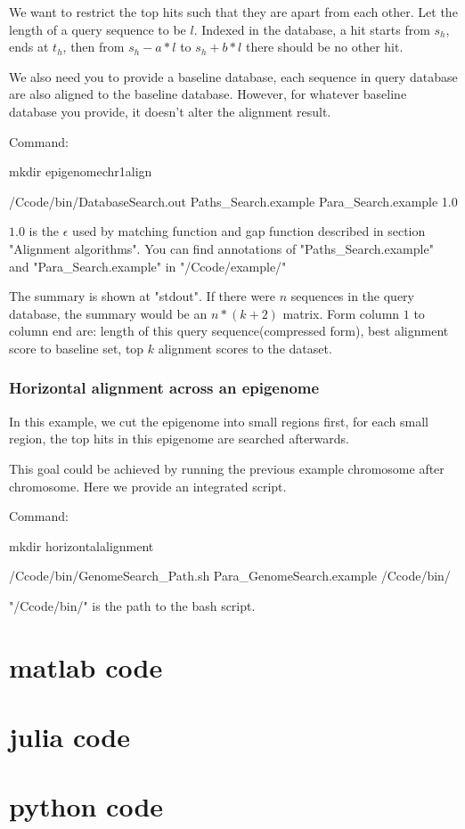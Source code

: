 \documentclass[a4paper]{article}
\begin{document}
\begin{CJK*}{UTF8}{kai}
We want to restrict the top hits such that they are apart from each other. Let the length of a query sequence to be $l$. Indexed in the database, a hit starts from $s_h$, ends at $t_h$, then from $s_h-a*l$ to $s_h+b*l$ there should be no other hit. 

We also need you to provide a baseline database, each sequence in query database are also aligned to the baseline database. However, for whatever baseline database you provide, it doesn't alter the alignment result.

Command:

mkdir epigenomechr1align

/Ccode/bin/DatabaseSearch.out Paths\_Search.example Para\_Search.example 1.0

$1.0$ is the $\epsilon$ used by matching function and gap function described in section "Alignment algorithms". You can find annotations of "Paths\_Search.example" and "Para\_Search.example" in "/Ccode/example/"

The summary is shown at "stdout". If there were $n$ sequences in the query database, the summary would be an $n*(k+2)$ matrix. Form column $1$ to column end are: length of this query sequence(compressed form), best alignment score to baseline set, top $k$ alignment scores to the dataset. 


\subsubsection{Horizontal alignment across an epigenome}

In this example, we cut the epigenome into small regions first, for each small region, the top hits in this epigenome are searched afterwards. 

This goal could be achieved by running the previous example chromosome after chromosome. Here we provide an integrated script.

Command: 

mkdir horizontalalignment

/Ccode/bin/GenomeSearch\_Path.sh Para\_GenomeSearch.example /Ccode/bin/

"/Ccode/bin/" is the path to the bash script.


\section{matlab code}

\section{julia code}

\section{python code}

\end{CJK*}
\end{document}
